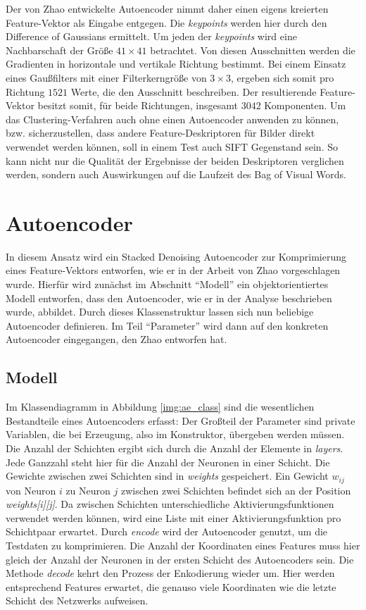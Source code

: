 Der von Zhao \cite{aed2016} entwickelte Autoencoder nimmt daher einen eigens kreierten Feature-Vektor als Eingabe entgegen. Die \textit{keypoints} werden hier durch den Difference of Gaussians ermittelt. Um jeden der \textit{keypoints} wird eine Nachbarschaft der Größe $41 \times 41$ betrachtet. Von diesen Ausschnitten werden die Gradienten in horizontale und vertikale Richtung bestimmt. Bei einem Einsatz eines Gaußfilters mit einer Filterkerngröße von $3 \times 3$, ergeben sich somit pro Richtung $1521$ Werte, die den Ausschnitt beschreiben. Der resultierende Feature-Vektor besitzt somit, für beide Richtungen, insgesamt $3042$ Komponenten.\newline
Um das Clustering-Verfahren auch ohne einen Autoencoder anwenden zu können, bzw. sicherzustellen, dass andere Feature-Deskriptoren für Bilder direkt verwendet werden können, soll in einem Test auch SIFT Gegenstand sein. So kann nicht nur die Qualität der Ergebnisse der beiden Deskriptoren verglichen werden, sondern auch Auswirkungen auf die Laufzeit des Bag of Visual Words.

\section{Autoencoder}

In diesem Ansatz wird ein Stacked Denoising Autoencoder zur Komprimierung eines Feature-Vektors entworfen, wie er in der Arbeit von Zhao \cite{aed2016} vorgeschlagen wurde. Hierfür wird zunächst im Abschnitt \enquote{Modell} ein objektorientiertes Modell entworfen, dass den Autoencoder, wie er in der Analyse beschrieben wurde, abbildet. Durch dieses Klassenstruktur lassen sich nun beliebige Autoencoder definieren. Im Teil \enquote{Parameter} wird dann auf den konkreten Autoencoder eingegangen, den Zhao entworfen hat.

\subsection{Modell}

Im Klassendiagramm in Abbildung \ref{img:ae_class} sind die wesentlichen Bestandteile eines Autoencoders erfasst: Der Großteil der Parameter sind private Variablen, die bei Erzeugung, also im Konstruktor, übergeben werden müssen. Die Anzahl der Schichten ergibt sich durch die Anzahl der Elemente in \textit{layers}. Jede Ganzzahl steht hier für die Anzahl der Neuronen in einer Schicht. Die Gewichte zwischen zwei Schichten sind in \textit{weights} gespeichert. Ein  Gewicht $w_{ij}$ von Neuron $i$ zu Neuron $j$ zwischen zwei Schichten befindet sich an der Position \textit{weights[i][j]}. Da zwischen Schichten unterschiedliche Aktivierungsfunktionen verwendet werden können, wird eine Liste  mit einer Aktivierungsfunktion pro Schichtpaar erwartet. \newline
Durch \textit{encode} wird der Autoencoder genutzt, um die Testdaten zu komprimieren. Die Anzahl der Koordinaten eines Features muss hier gleich der Anzahl der Neuronen in der ersten Schicht des Autoencoders sein. Die Methode \textit{decode} kehrt den Prozess der Enkodierung wieder um. Hier werden entsprechend Features erwartet, die genauso viele Koordinaten wie die letzte Schicht des Netzwerks aufweisen.
  
